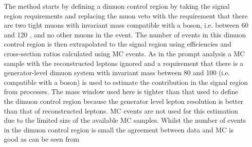 The method starts by defining a dimuon control region by taking the signal region requirements and replacing the muon veto with the requirement that there are two tight muons with invariant mass compatible with a \PZ boson, i.e. between 60 and 120 \GeV, and no other muons in the event. The number of events in this dimuon control region is then extrapolated to the signal region using efficiencies and cross-section ratios calculated using \ac{MC} events. As in the prompt analysis a \Zmumu \ac{MC} sample with the reconstructed leptons ignored and a requirement that there is a generator-level dimuon system with invariant mass between 80 and 100 \GeV (i.e. compatible with a \PZ boson) is used to estimate the contribution in the signal region from \Znunu processes. The mass window used here is tighter than that used to define the dimuon control region because the generator level lepton \pt resolution is better than that of reconstructed leptons. \Znunu \ac{MC} events are not used for this estimation due to the limited size of the available \Znunu \ac{MC} samples. Whilst the number of events in the dimuon control region is small the agreement between data and \ac{MC} is good as can be seen from 

